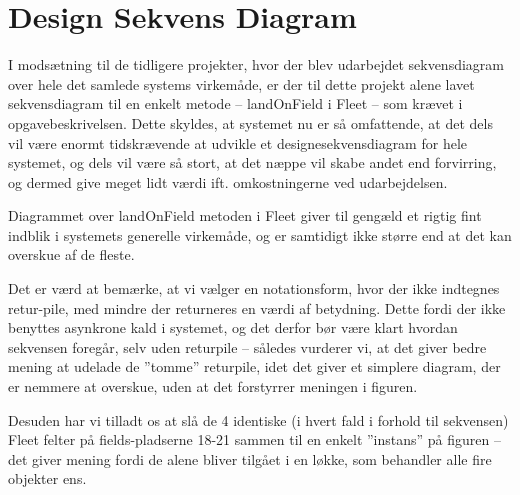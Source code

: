 \section{Design Sekvens Diagram}
I modsætning til de tidligere projekter, hvor der blev udarbejdet sekvensdiagram over hele det samlede systems virkemåde, er der til dette projekt alene lavet sekvensdiagram til en enkelt metode – landOnField i Fleet – som krævet i opgavebeskrivelsen. Dette skyldes, at systemet nu er så omfattende, at det dels vil være enormt tidskrævende at udvikle et designesekvensdiagram for hele systemet, og dels vil være så stort, at det næppe vil skabe andet end forvirring, og dermed give meget lidt værdi ift. omkostningerne ved udarbejdelsen.


Diagrammet over landOnField metoden i Fleet giver til gengæld et rigtig fint indblik i systemets generelle virkemåde, og er samtidigt ikke større end at det kan overskue af de fleste.


Det er værd at bemærke, at vi vælger en notationsform, hvor der ikke indtegnes retur-pile, med mindre der returneres en værdi af betydning. Dette fordi der ikke benyttes asynkrone kald i systemet, og det derfor bør være klart hvordan sekvensen foregår, selv uden returpile – således vurderer vi, at det giver bedre mening at udelade de ”tomme” returpile, idet det giver et simplere diagram, der er nemmere at overskue, uden at det forstyrrer meningen i figuren.

Desuden har vi tilladt os at slå de 4 identiske (i hvert fald i forhold til sekvensen) Fleet felter på fields-pladserne 18-21 sammen til en enkelt ”instans” på figuren – det giver mening fordi de alene bliver tilgået i en løkke, som behandler alle fire objekter ens.


